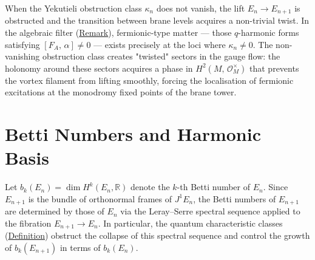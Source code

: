 \begin{remark}
  \label{rem:fermionic-twisted-sectors}
When the Yekutieli obstruction class $\kappa_n$ does not vanish, the
lift $E_n \to E_{n+1}$ is obstructed and the transition between brane
levels acquires a non-trivial twist.  In the algebraic filter
(\hyperref[rem:algebraic-filter]{Remark}), fermionic-type matter --- those
$q$-harmonic forms satisfying $[F_A,\, \alpha] \neq 0$ --- exists
precisely at the loci where $\kappa_n \neq 0$.  The non-vanishing
obstruction class creates "twisted" sectors in the gauge flow: the
holonomy around these sectors acquires a phase in
$H^2(M,\, \mathcal{O}_M^{\times})$ that prevents the vortex filament
from lifting smoothly, forcing the localisation of fermionic excitations
at the monodromy fixed points of the brane tower.
\end{remark}

\section{Betti Numbers and Harmonic Basis}
\label{sec:betti-harmonic}

\begin{remark}
  \label{rem:betti-numbers-brane}
Let $b_k(E_n) = \dim H^k(E_n, \mathbb{R})$ denote the $k$-th Betti number of
$E_n$.  Since $E_{n+1}$ is the bundle of orthonormal frames of $J^1 E_n$, the
Betti numbers of $E_{n+1}$ are determined by those of $E_n$ via the Leray--Serre
spectral sequence applied to the fibration
$E_{n+1} \to E_n$.  In particular, the quantum characteristic classes
(\hyperref[def:quantum-characteristic-classes]{Definition}) obstruct the collapse of
this spectral sequence and control the growth of $b_k(E_{n+1})$ in terms of
$b_k(E_n)$.
\end{remark}

